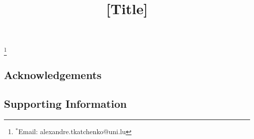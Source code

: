 

\title{[Title]}




\begingroup
\renewcommand\thefootnote{}\footnote{$^*$Email: alexandre.tkatchenko@uni.lu}%
\addtocounter{footnote}{-1}%
\endgroup



\subsection{Acknowledgements}

\subsection{Supporting Information}

\begingroup
\setlength\bibsep{0pt}
\footnotesize

\endgroup


